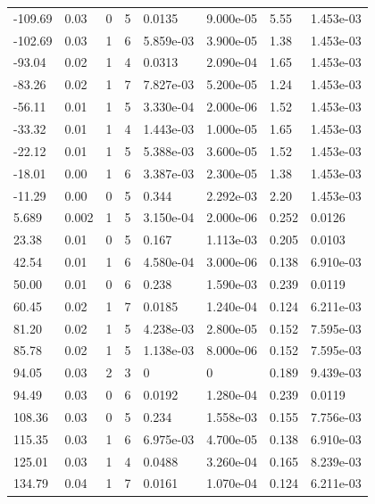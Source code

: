 \documentclass[preview]{standalone}
\begin{document}
{{\begin{tabular}{L{1.2cm}C{1.2cm} C{0.3cm}C{0.5cm} C{1.4cm}C{1.4cm} C{1.4cm}C{1.4cm}}
  -109.69  &  0.03  & 0     &  5 &  0.0135  & 9.000e-05  & 5.55 &  1.453e-03   \\ 
  -102.69  &  0.03  & 1     &  6 &  5.859e-03  & 3.900e-05  & 1.38 &  1.453e-03   \\ 
  -93.04  &  0.02  & 1     &  4 &  0.0313  & 2.090e-04  & 1.65 &  1.453e-03   \\ 
  -83.26  &  0.02  & 1     &  7 &  7.827e-03  & 5.200e-05  & 1.24 &  1.453e-03   \\ 
  -56.11  &  0.01  & 1     &  5 &  3.330e-04  & 2.000e-06  & 1.52 &  1.453e-03   \\ 
  -33.32  &  0.01  & 1     &  4 &  1.443e-03  & 1.000e-05  & 1.65 &  1.453e-03   \\ 
  -22.12  &  0.01  & 1     &  5 &  5.388e-03  & 3.600e-05  & 1.52 &  1.453e-03   \\ 
  -18.01  &  0.00  & 1     &  6 &  3.387e-03  & 2.300e-05  & 1.38 &  1.453e-03   \\ 
  -11.29  &  0.00  & 0     &  5 &  0.344  & 2.292e-03  & 2.20 &  1.453e-03   \\ 
  5.689  &  0.002  & 1     &  5 &  3.150e-04  & 2.000e-06  & 0.252 &  0.0126   \\ 
  23.38  &  0.01  & 0     &  5 &  0.167  & 1.113e-03  & 0.205 &  0.0103   \\ 
  42.54  &  0.01  & 1     &  6 &  4.580e-04  & 3.000e-06  & 0.138 &  6.910e-03   \\ 
  50.00  &  0.01  & 0     &  6 &  0.238  & 1.590e-03  & 0.239 &  0.0119   \\ 
  60.45  &  0.02  & 1     &  7 &  0.0185  & 1.240e-04  & 0.124 &  6.211e-03   \\ 
  81.20  &  0.02  & 1     &  5 &  4.238e-03  & 2.800e-05  & 0.152 &  7.595e-03   \\ 
  85.78  &  0.02  & 1     &  5 &  1.138e-03  & 8.000e-06  & 0.152 &  7.595e-03   \\ 
  94.05  &  0.03  & 2     &  3 &  0  & 0  & 0.189 &  9.439e-03   \\ 
  94.49  &  0.03  & 0     &  6 &  0.0192  & 1.280e-04  & 0.239 &  0.0119   \\ 
  108.36  &  0.03  & 0     &  5 &  0.234  & 1.558e-03  & 0.155 &  7.756e-03   \\ 
  115.35  &  0.03  & 1     &  6 &  6.975e-03  & 4.700e-05  & 0.138 &  6.910e-03   \\ 
  125.01  &  0.03  & 1     &  4 &  0.0488  & 3.260e-04  & 0.165 &  8.239e-03   \\ 
  134.79  &  0.04  & 1     &  7 &  0.0161  & 1.070e-04  & 0.124 &  6.211e-03   \\ 

\end{tabular}}}
\end{document}
